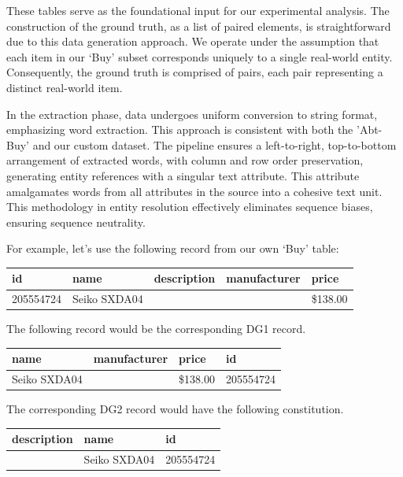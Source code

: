 \documentclass[11pt]{article}
\begin{document}
    These tables serve as the foundational input for our experimental analysis.
    The construction of the ground truth, as a list of paired elements, is
    straightforward due to this data generation approach.
    We operate under the assumption that each item in our `Buy' subset
    corresponds uniquely to a single real-world entity.
    Consequently, the ground truth is comprised of pairs, each pair representing
    a distinct real-world item.

    In the extraction phase, data undergoes uniform conversion to string format,
    emphasizing word extraction.
    This approach is consistent with both the 'Abt-Buy' and our custom dataset.
    The pipeline ensures a left-to-right, top-to-bottom arrangement of extracted
    words, with column and row order preservation, generating entity references
    with a singular text attribute.
    This attribute amalgamates words from all attributes in the source into a
    cohesive text unit. This methodology in entity resolution effectively
    eliminates sequence biases, ensuring sequence neutrality.

    For example, let's use the following record from our own `Buy' table:

    \begin{center}
        \begin{tabular}[b]{|l|l|l|l|l|}
            \hline
            id&name&description&manufacturer&price\\
            \hline
            205554724&Seiko SXDA04& & &\$138.00\\
            \hline
        \end{tabular}
    \end{center}

    The following record would be the corresponding DG1 record.
    
    \begin{center}
        \begin{tabular}[b]{|l|l|l|l|}
            \hline
            name&manufacturer&price&id \\
            \hline
            Seiko SXDA04& &\$138.00&205554724 \\
            \hline
        \end{tabular}
    \end{center}

    The corresponding DG2 record would have the following constitution.

    \begin{center}
        \begin{tabular}[b]{|l|l|l|}
            \hline
            description&name&id \\
            \hline
            &Seiko SXDA04&205554724 \\
            \hline
        \end{tabular}
    \end{center}
\end{document}
